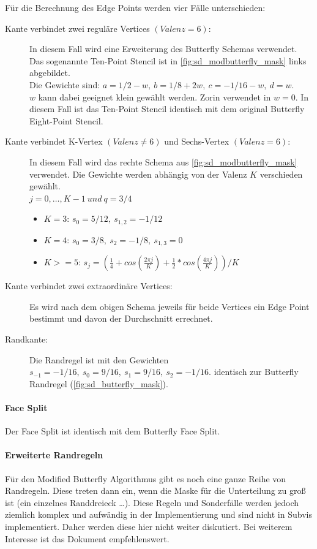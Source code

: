 Für die Berechnung des Edge Points werden vier Fälle unterschieden:
\begin{description}
\item[Kante verbindet zwei reguläre Vertices \((Valenz = 6)\):]
In diesem Fall wird eine Erweiterung
des Butterfly Schemas verwendet. Das sogenannte Ten-Point Stencil ist in \autoref{fig:sd_modbutterfly_mask} links abgebildet.\\
Die Gewichte sind:
\(a = 1/2 - w,\ b = 1/8 + 2w,\ c = -1/16 - w,\ d = w\).\\
\(w\) kann dabei geeignet klein gewählt werden.
Zorin verwendet in \cite{Zorin:1996:ISM:237170.237254} \(w = 0\).
In diesem Fall ist das Ten-Point Stencil identisch mit dem original
Butterfly Eight-Point Stencil.
\item[Kante verbindet K-Vertex \((Valenz \neq 6)\) und Sechs-Vertex \((Valenz = 6)\):]
In diesem Fall wird das rechte Schema aus \autoref{fig:sd_modbutterfly_mask} verwendet.
Die Gewichte werden abhängig von der Valenz \(K\) verschieden gewählt.\\
\(j = 0, \ldots, K - 1\ und\ q = 3/4\)
\begin{itemize}
 \item \(K = 3\): \(s_0 = 5/12,\ s_{1,2} = -1/12\)
 \item \(K = 4\): \(s_0 = 3/8,\ s_{2} = -1/8,\ s_{1,3} = 0\)
 \item \(K >= 5\): \(s_j = (\frac{1}{4}+ cos(\frac{2 \pi j}{K}) + \frac{1}{2} * cos(\frac{4 \pi j}{K}))/K\)
\end{itemize}
\item[Kante verbindet zwei extraordinäre Vertices:]
Es wird nach dem obigen Schema jeweils für beide Vertices ein Edge Point bestimmt und
davon der Durchschnitt errechnet.
\item[Randkante:] Die Randregel ist mit den Gewichten
\(s_{-1} = -1/16,\ s_0 = 9/16,\ s_1 = 9/16,\ s_2 = -1/16\).
identisch zur Butterfly Randregel
(\autoref{fig:sd_butterfly_mask}).
\end{description}
\cite{Zorin:1996:ISM:237170.237254}
\cite[S. 72ff]{Zorin.subdivcourse}
\cite{Gamasutra}
\cite{Sharp}


\paragraph*{Face Split}
Der Face Split ist identisch mit dem Butterfly Face Split.
\cite{Zorin:1996:ISM:237170.237254}
\cite[S. 72ff]{Zorin.subdivcourse}

\paragraph*{Erweiterte Randregeln}

Für den Modified Butterfly Algorithmus gibt es noch eine ganze Reihe von
Randregeln. Diese treten dann ein, wenn die Maske für die Unterteilung zu groß ist
(ein einzelnes Randdreieck \ldots).
Diese Regeln und Sonderfälle werden jedoch ziemlich komplex und aufwändig in der Implementierung
und sind nicht in Subvis implementiert. Daher werden diese hier nicht weiter diskutiert.
Bei weiterem Interesse ist das Dokument \cite[S. 74f]{Zorin.subdivcourse}
empfehlenswert.
